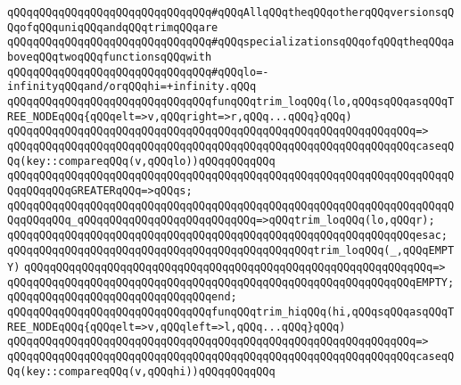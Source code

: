 \newline
\verb|qQQqqQQqqQQqqQQqqQQqqQQqqQQqqQQq#qQQqAllqQQqtheqQQqotherqQQqversionsqQQqofqQQquniqQQqandqQQqtrimqQQqare|\newline
\verb|qQQqqQQqqQQqqQQqqQQqqQQqqQQqqQQq#qQQqspecializationsqQQqofqQQqtheqQQqaboveqQQqtwoqQQqfunctionsqQQqwith|\newline
\verb|qQQqqQQqqQQqqQQqqQQqqQQqqQQqqQQq#qQQqlo=-infinityqQQqand/orqQQqhi=+infinity.qQQq|\newline
\newline
\newline
\verb|qQQqqQQqqQQqqQQqqQQqqQQqqQQqqQQqfunqQQqtrim_loqQQq(lo,qQQqsqQQqasqQQqTREE_NODEqQQq{qQQqelt=>v,qQQqright=>r,qQQq...qQQq}qQQq)|\newline
\verb|qQQqqQQqqQQqqQQqqQQqqQQqqQQqqQQqqQQqqQQqqQQqqQQqqQQqqQQqqQQqqQQq=>|\newline
\verb|qQQqqQQqqQQqqQQqqQQqqQQqqQQqqQQqqQQqqQQqqQQqqQQqqQQqqQQqqQQqqQQqcaseqQQq(key::compareqQQq(v,qQQqlo))qQQqqQQqqQQq|\newline
\verb|qQQqqQQqqQQqqQQqqQQqqQQqqQQqqQQqqQQqqQQqqQQqqQQqqQQqqQQqqQQqqQQqqQQqqQQqqQQqqQQqGREATERqQQq=>qQQqs;|\newline
\verb|qQQqqQQqqQQqqQQqqQQqqQQqqQQqqQQqqQQqqQQqqQQqqQQqqQQqqQQqqQQqqQQqqQQqqQQqqQQqqQQq_qQQqqQQqqQQqqQQqqQQqqQQqqQQq=>qQQqtrim_loqQQq(lo,qQQqr);|\newline
\verb|qQQqqQQqqQQqqQQqqQQqqQQqqQQqqQQqqQQqqQQqqQQqqQQqqQQqqQQqqQQqqQQqesac;|\newline
\newline
\verb|qQQqqQQqqQQqqQQqqQQqqQQqqQQqqQQqqQQqqQQqqQQqqQQqtrim_loqQQq(_,qQQqEMPTY)|\newline
\verb|qQQqqQQqqQQqqQQqqQQqqQQqqQQqqQQqqQQqqQQqqQQqqQQqqQQqqQQqqQQqqQQq=>|\newline
\verb|qQQqqQQqqQQqqQQqqQQqqQQqqQQqqQQqqQQqqQQqqQQqqQQqqQQqqQQqqQQqqQQqEMPTY;|\newline
\verb|qQQqqQQqqQQqqQQqqQQqqQQqqQQqqQQqend;|\newline
\newline
\newline
\verb|qQQqqQQqqQQqqQQqqQQqqQQqqQQqqQQqfunqQQqtrim_hiqQQq(hi,qQQqsqQQqasqQQqTREE_NODEqQQq{qQQqelt=>v,qQQqleft=>l,qQQq...qQQq}qQQq)|\newline
\verb|qQQqqQQqqQQqqQQqqQQqqQQqqQQqqQQqqQQqqQQqqQQqqQQqqQQqqQQqqQQqqQQq=>|\newline
\verb|qQQqqQQqqQQqqQQqqQQqqQQqqQQqqQQqqQQqqQQqqQQqqQQqqQQqqQQqqQQqqQQqcaseqQQq(key::compareqQQq(v,qQQqhi))qQQqqQQqqQQq|\newline
